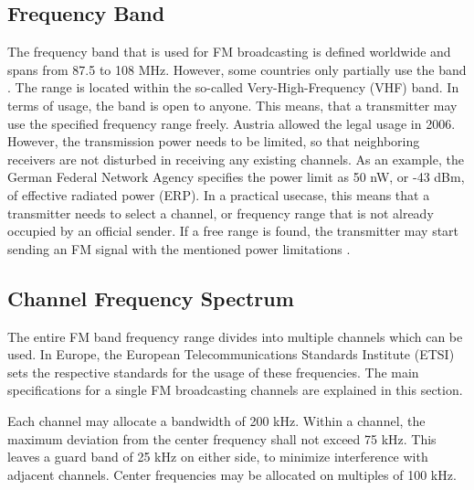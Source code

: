 \documentclass[conference]{IEEEtran}
\begin{document}
  \subsection{Frequency Band}
    The frequency band that is used for FM broadcasting is defined worldwide and spans from 87.5 to 108 MHz.
    However, some countries only partially use the band \cite{itu_regulations}.
    The range is located within the so-called Very-High-Frequency (VHF) band.
    In terms of usage, the band is open to anyone.
    This means, that a transmitter may use the specified frequency range freely.
    Austria allowed the legal usage in 2006.
    However, the transmission power needs to be limited, so that neighboring receivers are not disturbed in receiving any existing channels.
    As an example, the German Federal Network Agency specifies the power limit as 50 nW, or -43 dBm, of effective radiated power (ERP).
    In a practical usecase, this means that a transmitter needs to select a channel, or frequency range that is not already occupied by an official sender.
    If a free range is found, the transmitter may start sending an FM signal with the mentioned power limitations \cite{ebu_fm_modulators_in_europe_power_regulations}.


  \subsection{Channel Frequency Spectrum}
    The entire FM band frequency range divides into multiple channels which can be used.
    In Europe, the European Telecommunications Standards Institute (ETSI) sets the respective standards for the usage of these frequencies.
    The main specifications for a single FM broadcasting channels are explained in this section.

    Each channel may allocate a bandwidth of 200 kHz.
    Within a channel, the maximum deviation from the center frequency shall not exceed 75 kHz.
    This leaves a guard band of 25 kHz on either side, to minimize interference with adjacent channels.
    Center frequencies may be allocated on multiples of 100 kHz.
\end{document}
